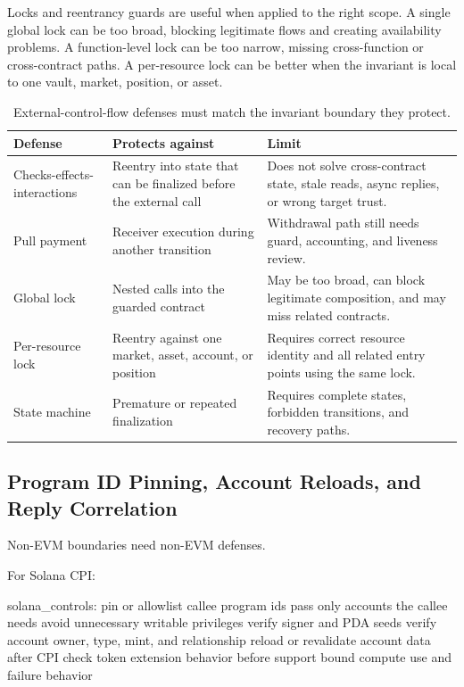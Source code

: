 Locks and reentrancy guards are useful when applied to the right scope. A single global lock can be too broad, blocking legitimate flows and creating availability problems. A function-level lock can be too narrow, missing cross-function or cross-contract paths. A per-resource lock can be better when the invariant is local to one vault, market, position, or asset.

\begin{table}[htbp]
\centering
\small
\renewcommand{\arraystretch}{1.16}
\begin{tabularx}{\textwidth}{@{}>{\RaggedRight\arraybackslash}p{}>{\RaggedRight\arraybackslash}p{}X@{}}
\toprule
Defense & Protects against & Limit \\
\midrule
Checks-effects-interactions & Reentry into state that can be finalized before the external call & Does not solve cross-contract state, stale reads, async replies, or wrong target trust. \\
Pull payment & Receiver execution during another transition & Withdrawal path still needs guard, accounting, and liveness review. \\
Global lock & Nested calls into the guarded contract & May be too broad, can block legitimate composition, and may miss related contracts. \\
Per-resource lock & Reentry against one market, asset, account, or position & Requires correct resource identity and all related entry points using the same lock. \\
State machine & Premature or repeated finalization & Requires complete states, forbidden transitions, and recovery paths. \\
\bottomrule
\end{tabularx}
\caption{External-control-flow defenses must match the invariant boundary they protect.}
\end{table}

\subsection{Program ID Pinning, Account Reloads, and Reply Correlation}

Non-EVM boundaries need non-EVM defenses.

For Solana CPI:

\begin{codeblock}
solana_controls:
    pin or allowlist callee program ids
    pass only accounts the callee needs
    avoid unnecessary writable privileges
    verify signer and PDA seeds
    verify account owner, type, mint, and relationship
    reload or revalidate account data after CPI
    check token extension behavior before support
    bound compute use and failure behavior
\end{codeblock}

